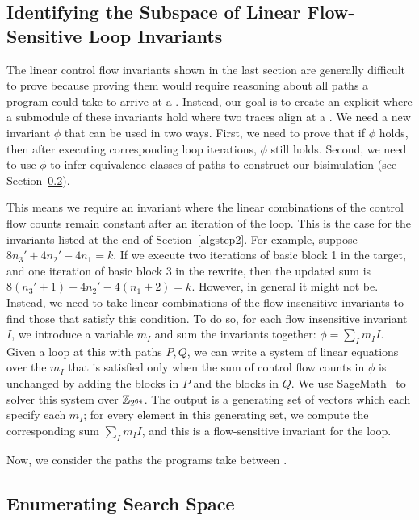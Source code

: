 \subsection{Identifying the Subspace of Linear Flow-Sensitive Loop Invariants} \label{algstep3}

The linear control flow invariants shown in the last section are
generally difficult to prove because proving them would require
reasoning about all paths a program could take to arrive at a
\cutpoint. Instead, our goal is to create an explicit \bisim{}
where a submodule of these invariants hold where two traces align
at a \cutpoint. We need a new invariant $\phi$ that can be used in
two ways. First, we need to prove that if $\phi$ holds, then after
executing corresponding loop iterations, $\phi$ still holds. Second,
we need to use $\phi$ to infer equivalence classes of paths to
construct our bisimulation (see Section~\ref{algstep4}).  

This means we require an invariant where the linear combinations
of the control flow counts remain constant after an iteration of
the loop. This is the case for the invariants listed at the end of
Section~\ref{algstep2}. For example, suppose $8n_3' + 4n_2' - 4n_1 =
k$. If we execute two iterations of basic block 1 in the target, and
one iteration of basic block 3 in the rewrite, then the updated sum
is $8(n_3'+1) + 4n_2' - 4(n_1+2) = k$. However, in general it might
not be. Instead, we need to take linear combinations of the flow
insensitive invariants to find those that satisfy this condition.
To do so, for each flow insensitive invariant $I$, we introduce a
variable $m_I$ and sum the invariants together: $\phi = \sum_I m_II$.
Given a loop at this \cutpoint{} with paths $P, Q$, we can write a
system of linear equations over the $m_I$ that is satisfied only when
the sum of control flow counts in $\phi$ is unchanged by adding the
blocks in $P$ and the blocks in $Q$. We use SageMath~\cite{sagemath}
to solver this system over $\mathbb{Z}_{2^{64}}$. The output is a generating set
of vectors which each specify each $m_I$; for every element in this
generating set, we compute the corresponding sum $\sum_I m_II$, and
this is a flow-sensitive invariant for the loop.

Now, we consider the paths the programs take between \cutpoints.

\subsection{Enumerating Search Space} \label{algstep4}

